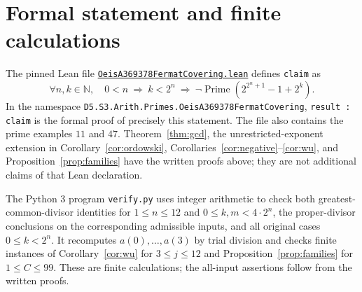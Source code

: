 \documentclass[11pt]{article}
\newcommand{\NN}{\mathbb{N}}
\begin{document}
\section{Formal statement and finite calculations}
The pinned Lean file
\href{https://github.com/the-omega-institute/trureturing/blob/a89e0fb9ba0f9002502ec8125455c2c2a9281443/D5/S3/Arith/Primes/OeisA369378FermatCovering.lean}{\texttt{OeisA369378FermatCovering.lean}}
defines \texttt{claim} as
\[
 \forall n,k\in\NN,\quad 0<n\ \Longrightarrow\ k<2^n\ \Longrightarrow\
 \neg\operatorname{Prime}(2^{2^n+1}-1+2^k).
\]
In the namespace \texttt{D5.S3.Arith.Primes.OeisA369378FermatCovering},
\texttt{result : claim} is the formal proof of precisely this statement.
The file also contains the prime examples $11$ and $47$.
Theorem~\ref{thm:gcd}, the unrestricted-exponent extension in
Corollary~\ref{cor:ordowski}, Corollaries~\ref{cor:negative}--\ref{cor:wu}, and
Proposition~\ref{prop:families} have the written proofs above; they are
not additional claims of that Lean declaration.

The Python 3 program \texttt{verify.py} uses integer arithmetic to check
both greatest-common-divisor identities for $1\leq n\leq12$ and
$0\leq k,m<4\cdot2^n$, the proper-divisor conclusions on the corresponding
admissible inputs, and all original cases $0\leq k<2^n$.
It recomputes $a(0),\ldots,a(3)$ by trial division and checks finite
instances of Corollary~\ref{cor:wu} for $3\leq j\leq12$ and
Proposition~\ref{prop:families} for $1\leq C\leq99$. These are finite
calculations; the all-input assertions follow from the written proofs.
\end{document}
